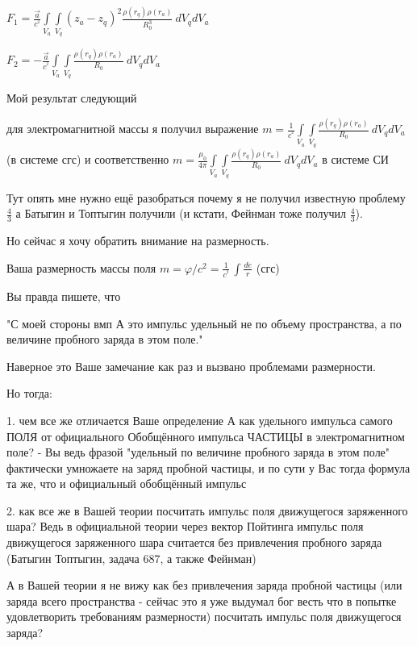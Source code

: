 \documentclass{article}
\begin{document}
${{F}_{1}}=\frac{\overrightarrow{a}}{{{c}^{^{2}}}}\int\limits_{{{V}_{a}}}{\int\limits_{{{V}_{q}}}{\left( {{z}_{a}}-{{z}_{q}} \right)^2\frac{\rho \left( {{r}_{q}} \right)\rho \left( {{r}_{a}} \right)}{R_{0}^3}}}\ d{{V}_{q}}d{{V}_{a}}$


${{F}_{2}}=-\frac{\overrightarrow{a}}{{{c}^{^{2}}}}\int\limits_{{{V}_{a}}}{\int\limits_{{{V}_{q}}}{\frac{\rho \left( {{r}_{q}} \right)\rho \left( {{r}_{a}} \right)}{R_{0}}}}\ d{{V}_{q}}d{{V}_{a}}$


Мой результат следующий

для электромагнитной массы я получил выражение
$m=\frac{1}{{{c}^{^{2}}}}\int\limits_{{{V}_{a}}}{\int\limits_{{{V}_{q}}}{\frac{\rho \left( {{r}_{q}} \right)\rho \left( {{r}_{a}} \right)}{R_{0}}}}\ d{{V}_{q}}d{{V}_{a}}$ (в системе сгс) и соответственно $m=\frac{{{\mu }_{0}}}{4\pi }\int\limits_{{{V}_{a}}}{\int\limits_{{{V}_{q}}}{\frac{\rho \left( {{r}_{q}} \right)\rho \left( {{r}_{a}} \right)}{R_{0}}}}\ d{{V}_{q}}d{{V}_{a}}$ в системе СИ

Тут опять мне нужно ещё разобраться почему я не получил известную проблему $\frac{4}{3}$ а Батыгин и Топтыгин получили (и кстати, Фейнман тоже получил $\frac{4}{3}$).

Но сейчас я хочу обратить внимание на размерность.

Ваша размерность массы поля $m = \varphi/c^2 =\frac{1}{{{c}^{^{2}}}}\,\int\frac{de}{r}$ (сгс)

Вы правда пишете, что

"С моей стороны вмп А это импульс удельный не по объему пространства, а по величине пробного заряда в этом поле."

Наверное это Ваше замечание как раз и вызвано проблемами размерности.

Но тогда:

1. чем все же отличается Ваше определение А как удельного импульса самого ПОЛЯ от официального Обобщённого импульса ЧАСТИЦЫ в электромагнитном поле? - Вы ведь фразой "удельный по величине пробного заряда в этом поле" фактически умножаете на заряд пробной частицы, и по сути у Вас тогда формула та же, что и официальный обобщённый импульс

2. как все же в Вашей теории посчитать импульс поля движущегося заряженного шара? Ведь в официальной теории через вектор Пойтинга импульс поля движущегося заряженного шара считается без привлечения пробного заряда (Батыгин Топтыгин, задача 687, а также Фейнман)

А в Вашей теории я не вижу как без привлечения заряда пробной частицы (или заряда всего пространства - сейчас это я уже выдумал бог весть что в попытке удовлетворить требованиям размерности)  посчитать импульс поля движущегося заряда?
\end{document}
